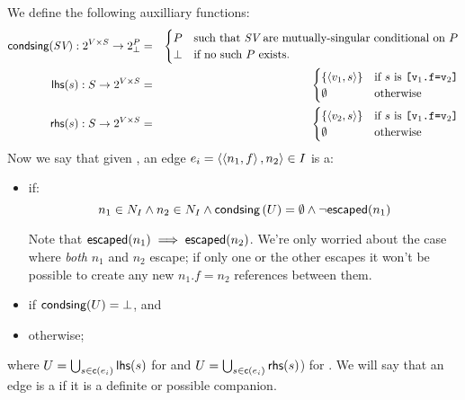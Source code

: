 \documentclass[11pt,notitlepage]{article}
\newcommand{\bigvar}[1]{\ensuremath{\text{\it #1}}}
\newcommand{\func}[1]{\ensuremath{\text{\sffamily #1}}}
\begin{document}

We define the following auxilliary functions:
\begin{eqnarray*}
\func{condsing}(\bigvar{SV}):2^{V\times S}\to 2^P_\bot &=& \begin{cases}
P&\text{such that }\bigvar{SV}\text{ are mutually-singular conditional on }P \\
\bot & \text{if no such }P\text{ exists.}
\end{cases}
\\
\func{lhs}(s):S\to 2^{V\times S} &=& \begin{cases}
\left\{\tuple{v_1,s}\right\} &\text{if $s$ is \tt [v$_1$.f=v$_2$]}\\
\emptyset & \text{otherwise}
\end{cases}
\\
\func{rhs}(s):S\to 2^{V\times S} &=& \begin{cases}
\left\{\tuple{v_2,s}\right\} &\text{if $s$ is \tt [v$_1$.f=v$_2$]}\\
\emptyset & \text{otherwise}
\end{cases}
\end{eqnarray*}
Now we say that given \tuple{O,I,\func{e},\func{c},r},
an edge $e_i=\left\langle \left\langle n_1,f \right\rangle,n_2 \right\rangle \in I$ is a:
\begin{itemize}
\item {} if:
\[
 n_1\in N_I \wedge n_2\in N_I \wedge
 \func{condsing}\left(U\right)=\emptyset \wedge
 \neg\func{escaped}(n_1)
\]

Note that $\func{escaped}(n_1)\implies\func{escaped}(n_2)$.  
We're only worried about the case where {\it both} $n_1$ and $n_2$
escape; if only one or the other escapes it won't be possible to
create any new $n_1.f=n_2$ references between them.
\item {} if \(
 \func{condsing}(U) = \bot
\), and
\item {} otherwise;
\end{itemize}
where 
$U=\bigcup_{s\in\func{c}(e_i)} \func{lhs}(s)$ for  and
$U=\bigcup_{s\in\func{c}(e_i)} \func{rhs}(s)$) for .
We will say that an edge is a  if it is a
definite or possible companion.  
\end{document}
